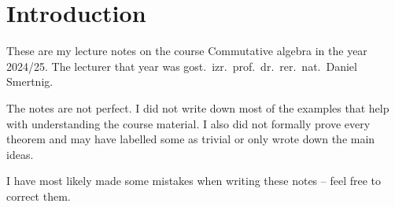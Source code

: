 \section*{Introduction}

These are my lecture notes on the course Commutative algebra in
the year 2024/25. The lecturer that year was
gost.~izr.~prof.~dr.~rer.~nat.~Daniel Smertnig.

The notes are not perfect. I did not write down most of the examples
that help with understanding the course material. I also did not
formally prove every theorem and may have labelled some as trivial or
only wrote down the main ideas.

I have most likely made some mistakes when writing these notes --
feel free to correct them.
